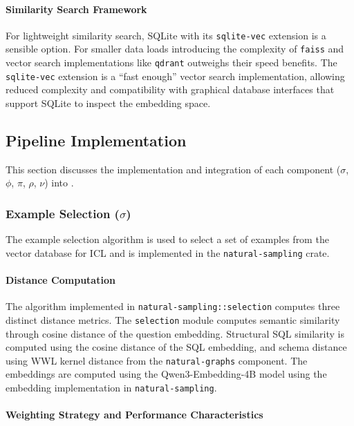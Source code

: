 \paragraph{Similarity Search Framework}

For lightweight similarity search, SQLite with its \texttt{sqlite-vec} extension
is a sensible option. For smaller data loads introducing the complexity of
\texttt{faiss} and vector search implementations like \texttt{qdrant} outweighs
their speed benefits. The \texttt{sqlite-vec} extension is a ``fast enough''
vector search implementation, allowing reduced complexity and compatibility
with graphical database interfaces that support SQLite to inspect the embedding
space.

\subsection{Pipeline Implementation}

This section discusses the implementation and integration of each component
($\sigma$, $\phi$, $\pi$, $\rho$, $\nu$) into \Natural.

\subsubsection{Example Selection ($\sigma$)}

The example selection algorithm is used to select a set of examples from the
vector database for ICL and is implemented in the \texttt{natural-sampling}
crate.

\paragraph{Distance Computation}

The algorithm implemented in \texttt{natural-sampling::selection} computes
three distinct distance metrics. The \texttt{selection} module computes
semantic similarity through cosine distance of the question embedding.
Structural SQL similarity is computed using the cosine distance of the SQL
embedding, and schema distance using WWL kernel distance from the
\texttt{natural-graphs} component. The embeddings are computed using the
Qwen3-Embedding-4B model using the embedding implementation in
\texttt{natural-sampling}.

\paragraph{Weighting Strategy and Performance Characteristics}

